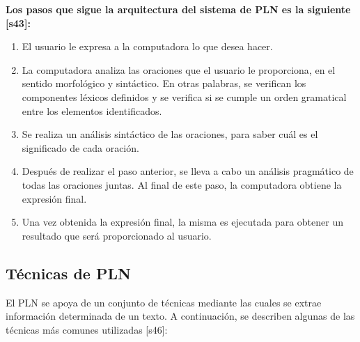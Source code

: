 \textbf{Los pasos que sigue la arquitectura del sistema de PLN es la siguiente [s43]:}
\begin{enumerate}
    \item El usuario le expresa a la computadora lo que desea hacer.\\
    \item La computadora analiza las oraciones que el usuario le proporciona, en el sentido morfológico y sintáctico. En otras palabras, se verifican los componentes léxicos definidos y se verifica si se cumple un orden gramatical entre los elementos identificados.\\
    \item Se realiza un análisis sintáctico de las oraciones, para saber cuál es el significado de cada oración.\\
    \item Después de realizar el paso anterior, se lleva a cabo un análisis pragmático de todas las oraciones juntas. Al final de este paso, la computadora obtiene la expresión final.\\
    \item Una vez obtenida la expresión final, la misma es ejecutada para obtener un resultado que será proporcionado al usuario.
\end{enumerate}

\subsection{Técnicas de PLN}
El PLN se apoya de un conjunto de técnicas mediante las cuales se extrae información determinada de un texto. A continuación, se describen algunas de las técnicas más comunes utilizadas [s46]:

